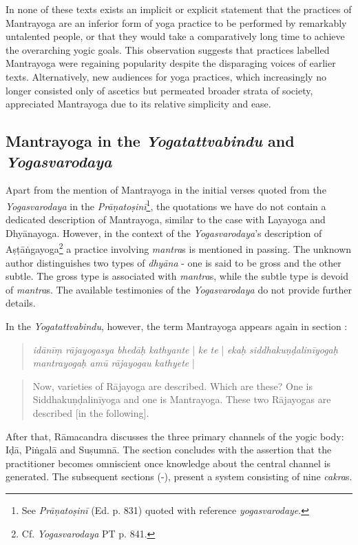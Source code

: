  In none of these texts exists an implicit or explicit statement that the practices of Mantrayoga are an inferior form of yoga practice to be performed by remarkably untalented people, or that they would take a comparatively long time to achieve the overarching yogic goals. This observation suggests that practices labelled Mantrayoga were regaining popularity despite the disparaging voices of earlier texts. Alternatively, new audiences for yoga practices, which increasingly no longer consisted only of ascetics but permeated broader strata of society, appreciated Mantrayoga due to its relative simplicity and ease.  

\subsection{Mantrayoga in the \textit{Yogatattvabindu} and \textit{Yogasvarodaya}}
\label{bindumantra}
Apart from the mention of Mantrayoga in the initial verses quoted from the \textit{Yogasvarodaya} in the \textit{Prāṇatoṣinī}\footnote{See \emph{Prāṇatoṣinī} (Ed. p. 831) quoted with reference \textit{yogasvarodaye}.}, the quotations we have do not contain a dedicated description of Mantrayoga, similar to the case with Layayoga and Dhyānayoga. However, in the context of the \emph{Yogasvarodaya}'s description of Aṣṭāṅgayoga\footnote{Cf. \emph{Yogasvarodaya} PT p. 841.} a practice involving \textit{mantra}s is mentioned in passing. The unknown author distinguishes two types of \textit{dhyāna} - one is said to be gross and the other subtle. The gross type is associated with \textit{mantra}s, while the subtle type is devoid of  \textit{mantra}s. The available testimonies of the \emph{Yogasvarodaya} do not provide further details.  

In the \textit{Yogatattvabindu}, however, the term Mantrayoga appears again in section :

\begin{quote}
  \textit{idānīṃ rājayogasya bhedāḥ kathyante} | \textit{ke te} | \textit{ekaḥ siddhakuṇḍalinīyogaḥ mantrayogaḥ amū rājayogau kathyete} |
\end{quote}
\begin{quote}
  Now, varieties of Rājayoga are described. Which are these? One is Siddhakuṇḍalinīyoga and one is Mantrayoga. These two Rājayogas are described [in the following].
\end{quote}

After that, Rāmacandra discusses the three primary channels of the yogic body: Iḍā, Piṅgalā and Suṣumnā. The section concludes with the assertion that the practitioner becomes omniscient once knowledge about the central channel is generated. The subsequent sections (-), present a system consisting of nine \textit{cakra}s.

